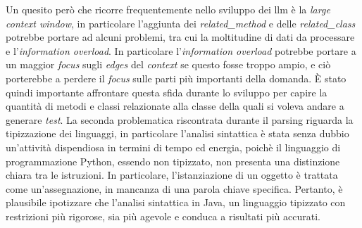     Un quesito però che ricorre frequentemente nello sviluppo dei \gls{llm} è la \textit{large context window}, in particolare l'aggiunta dei \textit{related\_method} e delle \textit{related\_class} potrebbe portare ad alcuni problemi, tra cui la moltitudine di dati da processare e l'\textit{information overload}.
    In particolare l'\textit{information overload} potrebbe portare a un maggior \textit{focus} sugli \textit{edges} del \textit{context} se questo fosse troppo ampio, e ciò porterebbe a perdere il \textit{focus} sulle parti più importanti della domanda. È stato quindi importante affrontare questa sfida durante lo sviluppo per capire la quantità di metodi e classi relazionate alla classe della quali si voleva andare a generare \textit{test}.
    La seconda problematica riscontrata durante il parsing riguarda la tipizzazione dei linguaggi, in particolare l'analisi sintattica è stata senza dubbio un'attività dispendiosa in termini di tempo ed energia, poichè il linguaggio di programmazione Python, essendo non tipizzato, non presenta una distinzione chiara tra le istruzioni. In particolare, l'istanziazione di un oggetto è trattata come un'assegnazione, in mancanza di una parola chiave specifica. Pertanto, è plausibile ipotizzare che l'analisi sintattica in Java, un linguaggio tipizzato con restrizioni più rigorose, sia più agevole e conduca a risultati più accurati.
    
